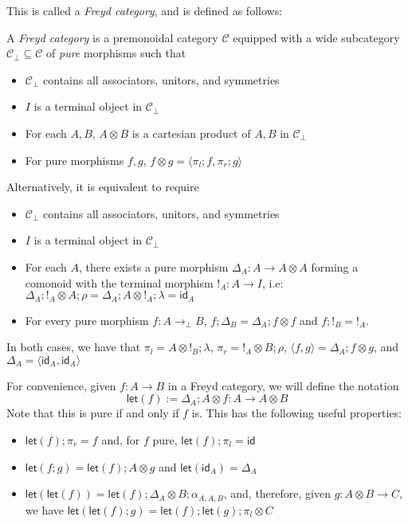 \documentclass[acmsmall,screen,review]{acmart}
\newcommand{\mc}[1]{\ensuremath{\mathcal{#1}}}
\newcommand{\ms}[1]{\ensuremath{\mathsf{#1}}}
\newcommand{\tmor}[1]{{!}_{#1}}
\newcommand{\dmor}[1]{{\Delta}_{#1}}
\newcommand{\lmor}[1]{\ms{let}(#1)}
\begin{document}
This is called a \emph{Freyd category}, and is defined as follows:


\begin{definition}
  A \emph{Freyd category} is a premonoidal category $\mc{C}$ equipped with a wide subcategory
  $\mc{C}_\bot \subseteq \mc{C}$ of \emph{pure} morphisms such that
  \begin{itemize}
    \item $\mc{C}_\bot$ contains all associators, unitors, and symmetries
    \item $I$ is a terminal object in $\mc{C}_\bot$
    \item For each $A, B$, $A \otimes B$ is a cartesian product of $A, B$ in $\mc{C}_\bot$
    \item For pure morphisms $f, g$, $f \otimes g = \langle \pi_l; f, \pi_r ; g  \rangle$
  \end{itemize}
  Alternatively, it is equivalent to require
  \begin{itemize}
    \item $\mc{C}_\bot$ contains all associators, unitors, and symmetries
    \item $I$ is a terminal object in $\mc{C}_\bot$
    \item For each $A$, there exists a pure morphism $\dmor{A} : A \to A \otimes A$ forming a
          comonoid with the terminal morphism $\tmor{A} : A \to I$, i.e: $\dmor{A} ; \tmor{A}
          \otimes A ; \rho = \dmor{A} ; A \otimes \tmor {A} ; \lambda = \ms{id}_A$
    \item For every pure morphism $f : A \to_\bot B$, $f ; \dmor{B} = \dmor{A} ; f \otimes f$
          and $f ; !_B = !_A$.  
  \end{itemize}
  In both cases, we have that $\pi_l = A \otimes \tmor{B} ; \lambda$, $\pi_r = \tmor{A}
  \otimes B ; \rho$, $\langle f, g \rangle = \dmor{A} ; f \otimes g$, and $\dmor{A} = \langle
  \ms{id}_A, \ms{id}_A \rangle$
\end{definition}
For convenience, given $f : A \to B$ in a Freyd category, we will define the notation
\begin{equation}
  \lmor{f} := \dmor{A} ; A \otimes f : A \to A \otimes B
\end{equation}
Note that this is pure if and only if $f$ is. This has the following useful properties:
\begin{itemize}
  \item $\lmor{f} ; \pi_r = f$ and, for $f$ pure, $\lmor{f} ; \pi_l = \ms{id}$
  \item $\lmor{f;g} = \lmor{f} ; A \otimes g$ and $\lmor{\ms{id}_A} = \dmor{A}$
  \item $\lmor{\lmor{f}} = \lmor{f} ; \dmor{A} \otimes B ; \alpha_{A, A, B}$, and, therefore, given
  $g: A \otimes B \to C$, we have $\lmor{\lmor{f};g} = \lmor{f} ; \lmor{g} ; \pi_l \otimes C$
\end{itemize}
\end{document}
